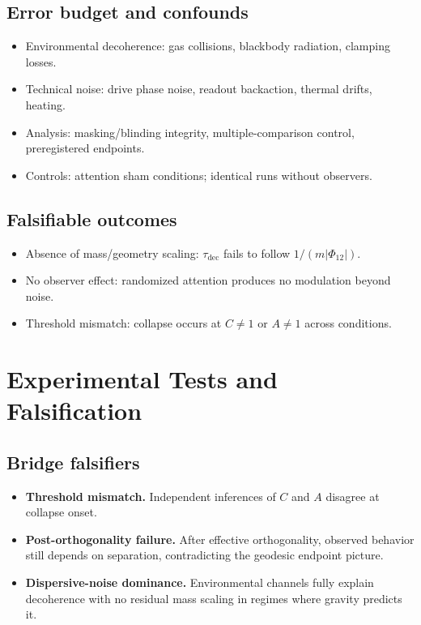 \documentclass[reprint,aps,prd,nofootinbib]{revtex4-2}
\begin{document}
\subsection{Error budget and confounds}
\begin{itemize}
  \item Environmental decoherence: gas collisions, blackbody radiation, clamping losses.
  \item Technical noise: drive phase noise, readout backaction, thermal drifts, heating.
  \item Analysis: masking/blinding integrity, multiple-comparison control, preregistered endpoints.
  \item Controls: attention sham conditions; identical runs without observers.
\end{itemize}

\subsection{Falsifiable outcomes}
\begin{itemize}
  \item Absence of mass/geometry scaling: $\tau_{\mathrm{dec}}$ fails to follow $1/(m|\Phi_{12}|)$.
  \item No observer effect: randomized attention produces no modulation beyond noise.
  \item Threshold mismatch: collapse occurs at $C\neq 1$ or $A\neq 1$ across conditions.
\end{itemize}

\section{Experimental Tests and Falsification}
\label{sec:falsifiers}

\subsection{Bridge falsifiers}
\begin{itemize}
  \item \textbf{Threshold mismatch.} Independent inferences of $C$ and $A$ disagree at collapse onset.
  \item \textbf{Post-orthogonality failure.} After effective orthogonality, observed behavior still depends on separation, contradicting the geodesic endpoint picture.
  \item \textbf{Dispersive-noise dominance.} Environmental channels fully explain decoherence with no residual mass scaling in regimes where gravity predicts it.
\end{itemize}
\end{document}
